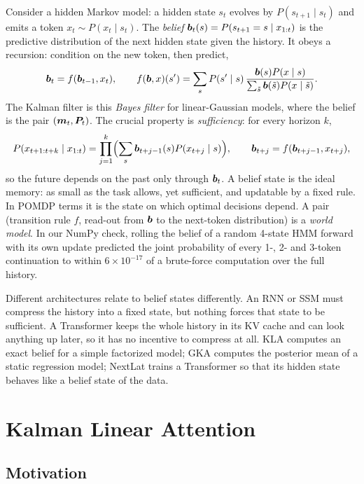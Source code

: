 Consider a hidden Markov model: a hidden state $s_t$ evolves by $P(s_{t+1}\mid s_t)$ and emits a
token $x_t\sim P(x_t\mid s_t)$. The \emph{belief} $\bm{b}_t(s)=P(s_{t+1}=s\mid x_{1:t})$ is the
predictive distribution of the next hidden state given the history. It obeys a recursion: condition
on the new token, then predict,
\begin{equation}\label{eq:c08-bayes-filter}
  \bm{b}_t = f(\bm{b}_{t-1},x_t),\qquad
  f(\bm{b},x)(s') = \sum_{s}P(s'\mid s)\,\frac{\bm{b}(s)P(x\mid s)}{\sum_{\tilde s}\bm{b}(\tilde s)P(x\mid\tilde s)} .
\end{equation}
The Kalman filter is this \emph{Bayes filter} for linear-Gaussian models, where the belief is the
pair $(\bm{m}_t,\bm{P}_t)$. The crucial property is \emph{sufficiency}: for every horizon $k$,
\[
  P(x_{t+1:t+k}\mid x_{1:t}) = \prod_{j=1}^{k}\Bigl(\sum_s \bm{b}_{t+j-1}(s)P(x_{t+j}\mid s)\Bigr),
  \qquad \bm{b}_{t+j}=f(\bm{b}_{t+j-1},x_{t+j}),
\]
so the future depends on the past only through $\bm{b}_t$. A belief state is the ideal memory: as
small as the task allows, yet sufficient, and updatable by a fixed rule. In POMDP terms
\citep{c08-kaelbling1998pomdp} it is the state on which optimal decisions depend. A pair
(transition rule $f$, read-out from $\bm{b}$ to the next-token distribution) is a \emph{world model}.
In our NumPy check, rolling the belief of a random 4-state HMM forward with its own update predicted
the joint probability of every 1-, 2- and 3-token continuation to within $6\times10^{-17}$ of a
brute-force computation over the full history.

Different architectures relate to belief states differently. An RNN or SSM must compress the
history into a fixed state, but nothing forces that state to be sufficient. A Transformer keeps the
whole history in its KV cache and can look anything up later, so it has no incentive to compress at
all. KLA computes an exact belief for a simple factorized model; GKA computes the posterior mean of
a static regression model; NextLat trains a Transformer so that its hidden state behaves like a
belief state of the data.

\section{Kalman Linear Attention}\label{sec:c08-kla}

\subsection{Motivation}

